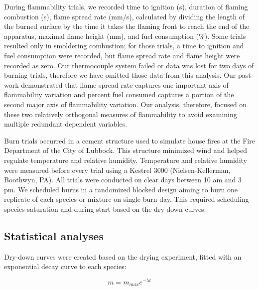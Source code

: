 \documentclass[letterpaper,12pt]{article}
\begin{document}
During flammability trials, we recorded time to ignition (s), duration of
flaming combustion (s), flame spread rate (mm/s), calculated by dividing the
length of the burned surface by the time it takes the flaming front to reach
the end of the apparatus, maximal flame height (mm), and fuel consumption (\%).
Some trials resulted only in smoldering combustion; for those trials, a time to
ignition and fuel consumption were recorded, but flame spread rate and flame
height were recorded as zero. Our thermocouple system failed or data was lost
for two days of burning trials, therefore we have omitted those data from this
analysis. Our past work \citep{Magalhaes+Schwilk-2012} demonstrated that flame
spread rate captures one important axis of flammability variation
\citep{Schwilk-2015, Pausas+Keeley+etal-2017, Prior+Murphy+etal-2018} and
percent fuel consumed captures a portion of the second major axis of
flammability variation. Our analysis, therefore, focused on these two
relatively orthogonal measures of flammability to avoid examining multiple
redundant dependent variables.

Burn trials occurred in a cement structure used to simulate house fires at the
Fire Department of the City of Lubbock. This structure minimized wind and
helped regulate temperature and relative humidity. Temperature and relative
humidity were measured before every trial using a Kestrel 3000
(Nielsen-Kellerman, Boothwyn, PA). All trials were conducted on clear days
between 10 am and 3 pm. We scheduled burns in a randomized blocked design
aiming to burn one replicate of each species or mixture on single burn day.
This required scheduling species saturation and during start based on the dry
down curves.

\subsection*{Statistical analyses}

Dry-down curves were created based on the drying experiment, fitted with an
exponential decay curve to each species:

\begin{equation}
m = m_{max} e^{-\lambda t}
\end{equation}
\end{document}
